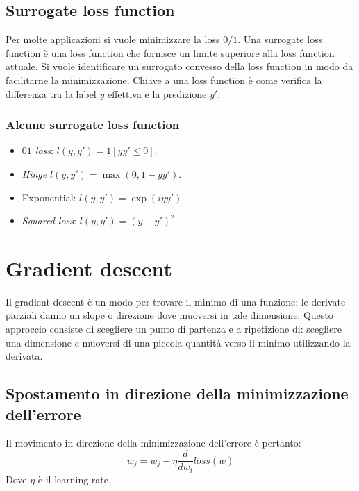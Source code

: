 	\subsection{Surrogate loss function}
	Per molte applicazioni si vuole minimizzare la loss $0/1$.
	Una surrogate loss function \`e una loss function che fornisce un limite superiore alla loss function attuale.
	Si vuole identificare un surrogato convesso della loss function in modo da facilitarne la minimizzazione.
	Chiave a una loss function \`e come verifica la differenza tra la label $y$ effettiva e la predizione $y'$.

		\subsubsection{Alcune surrogate loss function}
		\begin{multicols}{2}
			\begin{itemize}
				\item \emph{$01$ loss}: $l(y, y')=1[yy'\le 0]$.
				\item \emph{Hinge} $l(y,y')=\max(0,1-yy')$.
				\item Exponential: $l(y,y')=\exp(iyy')$
				\item \emph{Squared loss}: $l(y,y')=(y-y')^2$.
			\end{itemize}
		\end{multicols}

\section{Gradient descent}
Il gradient descent \`e un modo per trovare il minimo di una funzione: le derivate parziali danno un slope o direzione dove muoversi in tale dimensione.
Questo approccio consiste di scegliere un punto di partenza e a ripetizione di: scegliere una dimensione e muoversi di una piccola quantit\`a verso il minimo utilizzando la derivata.

	\subsection{Spostamento in direzione della minimizzazione dell'errore}
	Il movimento in direzione della minimizzazione dell'errore \`e pertanto:
	$$w_j = w_j - \eta \dfrac{d}{dw_i}loss(w)$$
	Dove $\eta$ \`e il learning rate.

